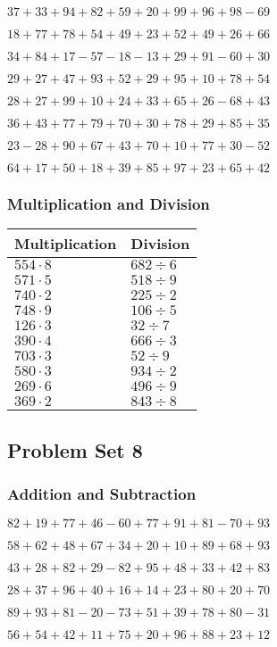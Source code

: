 \(37+33+94+82+59+20+99+96+98-69\)

\(18+77+78+54+49+23+52+49+26+66\)

\(34+84+17-57-18-13+29+91-60+30\)

\(29+27+47+93+52+29+95+10+78+54\)

\(28+27+99+10+24+33+65+26-68+43\)

\(36+43+77+79+70+30+78+29+85+35\)

\(23-28+90+67+43+70+10+77+30-52\)

\(64+17+50+18+39+85+97+23+65+42\)

\hypertarget{multiplication-and-division-6}{%
\subsubsection{Multiplication and
Division}\label{multiplication-and-division-6}}

\begin{longtable}[]{@{}ll@{}}
\toprule
Multiplication & Division\tabularnewline
\midrule
\endhead
\(554\cdot8\) & \(682÷6\)\tabularnewline
\(571\cdot5\) & \(518÷9\)\tabularnewline
\(740\cdot2\) & \(225÷2\)\tabularnewline
\(748\cdot9\) & \(106÷5\)\tabularnewline
\(126\cdot3\) & \(32÷7\)\tabularnewline
\(390\cdot4\) & \(666÷3\)\tabularnewline
\(703\cdot3\) & \(52÷9\)\tabularnewline
\(580\cdot3\) & \(934÷2\)\tabularnewline
\(269\cdot6\) & \(496÷9\)\tabularnewline
\(369\cdot2\) & \(843÷8\)\tabularnewline
\bottomrule
\end{longtable}

\hypertarget{problem-set-8}{%
\subsection{Problem Set 8}\label{problem-set-8}}

\hypertarget{addition-and-subtraction-7}{%
\subsubsection{Addition and
Subtraction}\label{addition-and-subtraction-7}}

\(82+19+77+46-60+77+91+81-70+93\)

\(58+62+48+67+34+20+10+89+68+93\)

\(43+28+82+29-82+95+48+33+42+83\)

\(28+37+96+40+16+14+23+80+20+70\)

\(89+93+81-20-73+51+39+78+80-31\)

\(56+54+42+11+75+20+96+88+23+12\)

